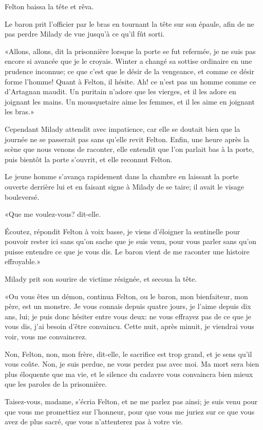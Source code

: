 Felton baissa la tête et rêva. 

Le baron prit l'officier par le bras en tournant la tête sur son épaule, afin de ne pas perdre Milady de vue jusqu'à ce qu'il fût sorti. 

«Allons, allons, dit la prisonnière lorsque la porte se fut refermée, je ne suis pas encore si avancée que je le croyais. Winter a changé sa sottise ordinaire en une prudence inconnue; ce que c'est que le désir de la vengeance, et comme ce désir forme l'homme! Quant à Felton, il hésite. Ah! ce n'est pas un homme comme ce d'Artagnan maudit. Un puritain n'adore que les vierges, et il les adore en joignant les mains. Un mousquetaire aime les femmes, et il les aime en joignant les bras.» 

Cependant Milady attendit avec impatience, car elle se doutait bien que la journée ne se passerait pas sans qu'elle revit Felton. Enfin, une heure après la scène que nous venons de raconter, elle entendit que l'on parlait bas à la porte, puis bientôt la porte s'ouvrit, et elle reconnut Felton. 

Le jeune homme s'avança rapidement dans la chambre en laissant la porte ouverte derrière lui et en faisant signe à Milady de se taire; il avait le visage bouleversé. 

«Que me voulez-vous? dit-elle. 

\speak  Écoutez, répondit Felton à voix basse, je viens d'éloigner la sentinelle pour pouvoir rester ici sans qu'on sache que je suis venu, pour vous parler sans qu'on puisse entendre ce que je vous dis. Le baron vient de me raconter une histoire effroyable.» 

Milady prit son sourire de victime résignée, et secoua la tête. 

«Ou vous êtes un démon, continua Felton, ou le baron, mon bienfaiteur, mon père, est un monstre. Je vous connais depuis quatre jours, je l'aime depuis dix ans, lui; je puis donc hésiter entre vous deux: ne vous effrayez pas de ce que je vous dis, j'ai besoin d'être convaincu. Cette nuit, après minuit, je viendrai vous voir, vous me convaincrez. 

\speak  Non, Felton, non, mon frère, dit-elle, le sacrifice est trop grand, et je sens qu'il vous coûte. Non, je suis perdue, ne vous perdez pas avec moi. Ma mort sera bien plus éloquente que ma vie, et le silence du cadavre vous convaincra bien mieux que les paroles de la prisonnière. 

\speak  Taisez-vous, madame, s'écria Felton, et ne me parlez pas ainsi; je suis venu pour que vous me promettiez sur l'honneur, pour que vous me juriez sur ce que vous avez de plus sacré, que vous n'attenterez pas à votre vie. 

